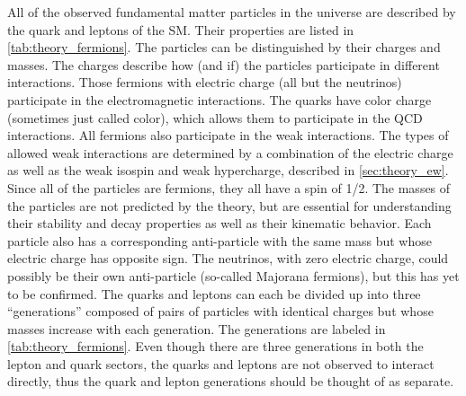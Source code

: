 All of the 
observed fundamental 
matter particles in the universe are described by the quark
and leptons of the SM. Their properties are listed 
in \tab\ref{tab:theory_fermions}. 
The particles can be distinguished
by their charges and masses.
The charges describe how (and if) the particles participate in
different interactions.
Those fermions with electric charge (all but the neutrinos) 
participate in the electromagnetic
interactions. The quarks have color charge (sometimes 
just called color), which allows them to 
participate in the QCD interactions. All fermions also participate in 
the weak interactions. The types of allowed weak interactions are determined
by a combination of the electric charge as well as the weak isospin
and weak hypercharge, described in \sec\ref{sec:theory_ew}.
Since all of the particles are fermions, they all have a spin of 1/2.
The masses of the particles are not predicted by the theory, but 
are essential for understanding their stability and decay properties
as well as their kinematic behavior.
Each particle also has a corresponding anti-particle with the same mass but
whose electric charge has opposite sign. The neutrinos, with zero 
electric charge, could possibly be their own 
anti-particle (so-called Majorana fermions), but
this has yet to be confirmed.
The quarks and leptons can each be divided up into three ``generations'' 
composed of pairs
of particles with identical charges but whose masses increase with each generation.
The generations are labeled in \tab\ref{tab:theory_fermions}. 
Even though there are three 
generations in both the lepton and quark sectors, 
the quarks and leptons are not observed to interact directly, 
thus the quark and lepton generations should be thought of as separate.

